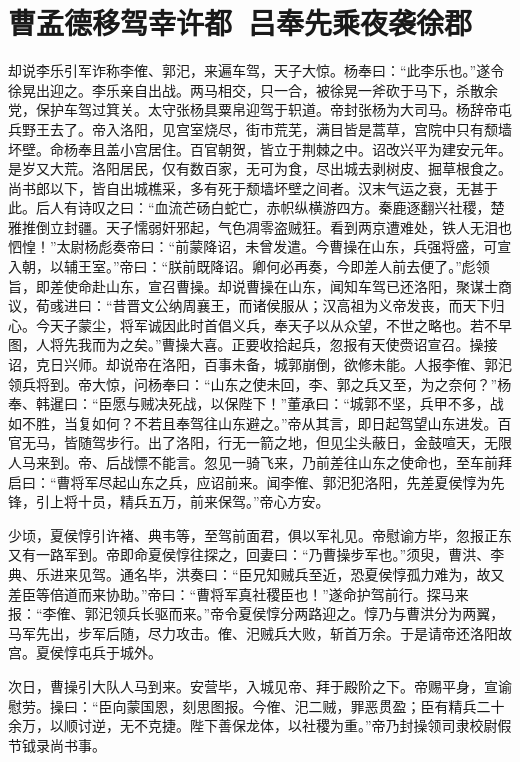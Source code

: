 \chapter{曹孟德移驾幸许都~吕奉先乘夜袭徐郡}

却说李乐引军诈称李傕、郭汜，来遍车驾，天子大惊。杨奉曰：“此李乐也。”遂令徐晃出迎之。李乐亲自出战。两马相交，只一合，被徐晃一斧砍于马下，杀散余党，保护车驾过箕关。太守张杨具粟帛迎驾于轵道。帝封张杨为大司马。杨辞帝屯兵野王去了。帝入洛阳，见宫室烧尽，街市荒芜，满目皆是蒿草，宫院中只有颓墙坏壁。命杨奉且盖小宫居住。百官朝贺，皆立于荆棘之中。诏改兴平为建安元年。是岁又大荒。洛阳居民，仅有数百家，无可为食，尽出城去剥树皮、掘草根食之。尚书郎以下，皆自出城樵采，多有死于颓墙坏壁之间者。汉末气运之衰，无甚于此。后人有诗叹之曰：“血流芒砀白蛇亡，赤帜纵横游四方。秦鹿逐翻兴社稷，楚雅推倒立封疆。天子懦弱奸邪起，气色凋零盗贼狂。看到两京遭难处，铁人无泪也怬惶！”太尉杨彪奏帝曰：“前蒙降诏，未曾发遣。今曹操在山东，兵强将盛，可宣入朝，以辅王室。”帝曰：“朕前既降诏。卿何必再奏，今即差人前去便了。”彪领旨，即差使命赴山东，宣召曹操。却说曹操在山东，闻知车驾已还洛阳，聚谋士商议，荀彧进曰：“昔晋文公纳周襄王，而诸侯服从；汉高祖为义帝发丧，而天下归心。今天子蒙尘，将军诚因此时首倡义兵，奉天子以从众望，不世之略也。若不早图，人将先我而为之矣。”曹操大喜。正要收拾起兵，忽报有天使赍诏宣召。操接诏，克日兴师。却说帝在洛阳，百事未备，城郭崩倒，欲修未能。人报李傕、郭汜领兵将到。帝大惊，问杨奉曰：“山东之使未回，李、郭之兵又至，为之奈何？”杨奉、韩暹曰：“臣愿与贼决死战，以保陛下！”董承曰：“城郭不坚，兵甲不多，战如不胜，当复如何？不若且奉驾往山东避之。”帝从其言，即日起驾望山东进发。百官无马，皆随驾步行。出了洛阳，行无一箭之地，但见尘头蔽日，金鼓喧天，无限人马来到。帝、后战慓不能言。忽见一骑飞来，乃前差往山东之使命也，至车前拜启曰：“曹将军尽起山东之兵，应诏前来。闻李傕、郭汜犯洛阳，先差夏侯惇为先锋，引上将十员，精兵五万，前来保驾。”帝心方安。

少顷，夏侯惇引许褚、典韦等，至驾前面君，俱以军礼见。帝慰谕方毕，忽报正东又有一路军到。帝即命夏侯惇往探之，回妻曰：“乃曹操步军也。”须臾，曹洪、李典、乐进来见驾。通名毕，洪奏曰：“臣兄知贼兵至近，恐夏侯惇孤力难为，故又差臣等倍道而来协助。”帝曰：“曹将军真社稷臣也！”遂命护驾前行。探马来报：“李傕、郭汜领兵长驱而来。”帝令夏侯惇分两路迎之。惇乃与曹洪分为两翼，马军先出，步军后随，尽力攻击。傕、汜贼兵大败，斩首万余。于是请帝还洛阳故宫。夏侯惇屯兵于城外。

次日，曹操引大队人马到来。安营毕，入城见帝、拜于殿阶之下。帝赐平身，宣谕慰劳。操曰：“臣向蒙国恩，刻思图报。今傕、汜二贼，罪恶贯盈；臣有精兵二十余万，以顺讨逆，无不克捷。陛下善保龙体，以社稷为重。”帝乃封操领司隶校尉假节钺录尚书事。


